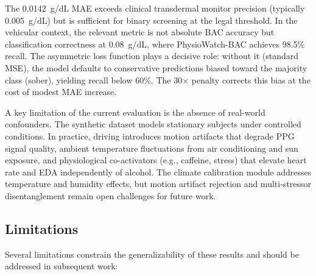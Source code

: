 \documentclass[HARVARD,Times2COL]{WileyNJDv5} %
\providecommand{\DIFadd}[1]{{\protect\color{red} #1}} %
\begin{document}
\DIFadd{The 0.0142~g/dL MAE exceeds clinical transdermal monitor precision (typically 0.005~g/dL) but is sufficient for binary screening at the legal threshold. In the vehicular context, the relevant metric is not absolute BAC accuracy but classification correctness at 0.08~g/dL, where PhysioWatch-BAC achieves 98.5\% recall. The asymmetric loss function plays a decisive role: without it (standard MSE), the model defaults to conservative predictions biased toward the majority class (sober), yielding recall below 60\%. The 30$\times$ penalty corrects this bias at the cost of modest MAE increase.
}

\DIFadd{A key limitation of the current evaluation is the absence of real-world confounders. The synthetic dataset models stationary subjects under controlled conditions. In practice, driving introduces motion artifacts that degrade PPG signal quality, ambient temperature fluctuations from air conditioning and sun exposure, and physiological co-activators (e.g., caffeine, stress) that elevate heart rate and EDA independently of alcohol. The climate calibration module addresses temperature and humidity effects, but motion artifact rejection and multi-stressor disentanglement remain open challenges for future work.
}

\subsection{\DIFadd{Limitations}}
\DIFadd{Several limitations constrain the generalizability of these results and should be addressed in subsequent work:
}
\end{document}
